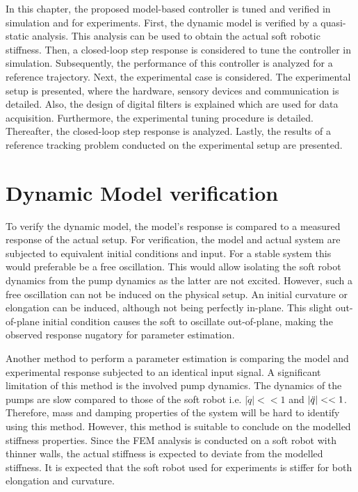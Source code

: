 \label{chap5}




In this chapter, the proposed model-based controller is tuned and verified in simulation and for experiments. First, the dynamic model is verified by a quasi-static analysis. This analysis can be used to obtain the actual soft robotic stiffness. Then, a closed-loop step response is considered to tune the controller in simulation. Subsequently, the performance of this controller is analyzed for a reference trajectory. Next, the experimental case is considered. The experimental setup is presented, where the hardware, sensory devices and communication is detailed. Also, the design of digital filters is explained which are used for data acquisition. Furthermore, the experimental tuning procedure is detailed. Thereafter, the closed-loop step response is analyzed. Lastly, the results of a reference tracking problem conducted on the experimental setup are presented. 



\section{Dynamic Model verification}



To verify the dynamic model, the model's response is compared to a measured response of the actual setup. For verification, the model and actual system are subjected to equivalent initial conditions and input. For a stable system this would preferable be a free oscillation. This would allow isolating the soft robot dynamics from the pump dynamics as the latter are not excited. However, such a free oscillation can not be induced on the physical setup. An initial curvature or elongation can be induced, although not being perfectly in-plane. This slight out-of-plane initial condition causes the soft to oscillate out-of-plane, making the observed response nugatory for parameter estimation.


Another method to perform a parameter estimation is comparing the model and experimental response subjected to an identical input signal. A significant limitation of this method is the involved pump dynamics. The dynamics of the pumps are slow compared to those of the soft robot i.e. $|\dot{q}|<< 1$ and $|\Ddot{q}|<< 1 $. Therefore, mass and damping properties of the system will be hard to identify using this method. However, this method is suitable to conclude on the modelled stiffness properties. Since the FEM analysis is conducted on a soft robot with thinner walls, the actual stiffness is expected to deviate from the modelled stiffness. It is expected that the soft robot used for experiments is stiffer for both elongation and curvature. 

